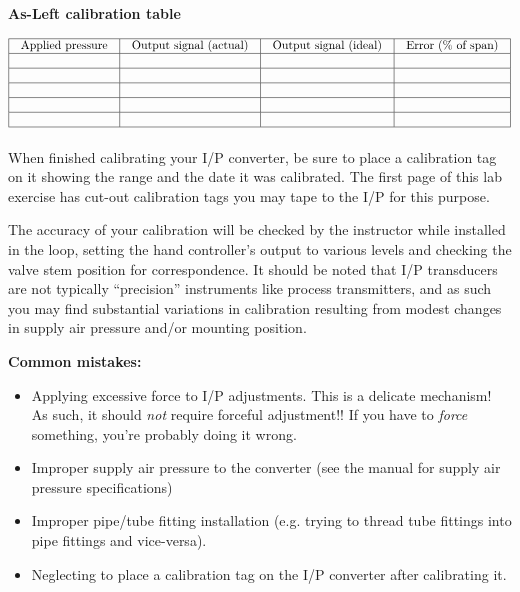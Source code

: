 \documentclass[12pt,a4paper]{article}
\begin{document}
\begin{itemize}
\vskip 10pt

{\bf As-Left calibration table}


$$\vbox{\offinterlineskip
\halign{\strut
\vrule \quad\hfil # \ \hfil & 
\vrule \quad\hfil # \ \hfil & 
\vrule \quad\hfil # \ \hfil & 
\vrule \quad\hfil # \ \hfil \vrule \cr
\noalign{\hrule}
%
Applied pressure & Output signal (actual) & Output signal (ideal) & Error (\% of span) \cr
%
\noalign{\hrule}
%
 &  &  & \cr
%
\noalign{\hrule}
%
 &  &  & \cr
%
\noalign{\hrule}
%
 &  &  & \cr
%
\noalign{\hrule}
%
 &  &  & \cr
%
\noalign{\hrule}
%
 &  &  & \cr
%
\noalign{\hrule}
} %
}$$ %

When finished calibrating your I/P converter, be sure to place a calibration tag on it showing the range and the date it was calibrated.  The first page of this lab exercise has cut-out calibration tags you may tape to the I/P for this purpose.

The accuracy of your calibration will be checked by the instructor while installed in the loop, setting the hand controller's output to various levels and checking the valve stem position for correspondence.  It should be noted that I/P transducers are not typically ``precision'' instruments like process transmitters, and as such you may find substantial variations in calibration resulting from modest changes in supply air pressure and/or mounting position.

\vskip 10pt

{\bf Common mistakes:}

\begin{itemize}
\item{} Applying excessive force to I/P adjustments.  This is a delicate mechanism!  As such, it should {\it not} require forceful adjustment!!  If you have to {\it force} something, you're probably doing it wrong.
\item{} Improper supply air pressure to the converter (see the manual for supply air pressure specifications)
\item{} Improper pipe/tube fitting installation (e.g. trying to thread tube fittings into pipe fittings and vice-versa).
\item{} Neglecting to place a calibration tag on the I/P converter after calibrating it.
\end{itemize}









\end{itemize}
\end{document}
